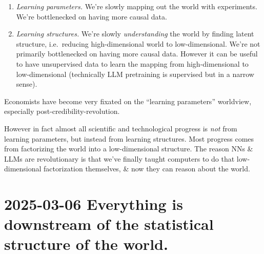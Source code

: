 \documentclass[
  10pt,
  letterpaper,
  DIV=11,
  numbers=noendperiod,
  oneside]{scrartcl}
\providecommand{\tightlist}{%
  \setlength{\itemsep}{0pt}\setlength{\parskip}{0pt}}\usepackage{longtable,booktabs,array}
\begin{document}
\begin{enumerate}
\def\labelenumi{\arabic{enumi}.}
\tightlist
\item
  \emph{Learning parameters.} We're slowly mapping out the world with
  experiments. We're bottlenecked on having more causal data.
\item
  \emph{Learning structures.} We're slowly \emph{understanding} the
  world by finding latent structure, i.e.~reducing high-dimensional
  world to low-dimensional. We're not primarily bottlenecked on having
  more causal data. However it can be useful to have unsupervised data
  to learn the mapping from high-dimensional to low-dimensional
  (technically LLM pretraining is supervised but in a narrow sense).
\end{enumerate}

Economists have become very fixated on the ``learning parameters''
worldview, especially post-credibility-revolution.

However in fact almost all scientific and technological progress is
\emph{not} from learning parameters, but instead from learning
structures. Most progress comes from factorizing the world into a
low-dimensional structure. The reason NNs \& LLMs are revolutionary is
that we've finally taught computers to do that low-dimensional
factorization themselves, \& now they can reason about the world.

\section{2025-03-06 \textbar{} Everything is downstream of the
statistical structure of the
world.}\label{everything-is-downstream-of-the-statistical-structure-of-the-world.}
\end{document}

